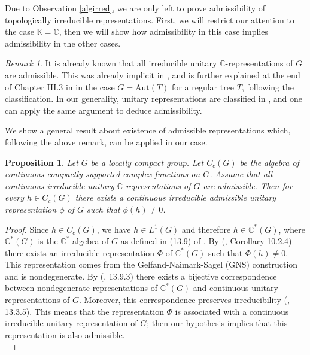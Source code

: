 \documentclass{article}
\theoremstyle{definition}
\theoremstyle{remark}
\newtheorem{rmk}[dfn]{Remark}
\theoremstyle{plain}
\newtheorem{prp}[dfn]{Proposition}
\begin{document}
Due to Observation \ref{algirred}, we are only left to prove admissibility of topologically irreducible representations. First, we will restrict our attention to the case $\mathbb{K}=\mathbb{C}$, then we will show how admissibility in this case implies admissibility in the other cases. \\

\begin{rmk}
    It is already known that all irreducible unitary $\mathbb{C}$-representations of $G$ are admissible. This was already implicit in \cite{olsh2}, and is further explained at the end of Chapter III.3 in \cite{talanebbia} in the case $G=\mathrm{Aut}(T)$ for a regular tree $T$, following the classification. In our generality, unitary representations are classified in \cite{amann}, and one can apply the same argument to deduce admissibility. \\
\end{rmk}

We show a general result about existence of admissible representations which, following the above remark, can be applied in our case.

\begin{prp} \label{exadm}
    Let $G$ be a locally compact group. Let $C_c(G)$ be the algebra of continuous compactly supported complex functions on $G$. Assume that all continuous irreducible unitary $\mathbb{C}$-representations of $G$ are admissible. Then for every $h\in C_c(G)$ there exists a continuous irreducible admissible unitary representation $\phi$ of $G$ such that $\phi(h)\neq 0$.
\end{prp}

\begin{proof}
     Since $h\in C_c(G)$, we have $h\in L^1(G)$ and therefore $h\in\mathbb{C}^*(G)$, where $\mathbb{C}^*(G)$ is the $\mathbb{C}^*$-algebra of $G$ as defined in (13.9) of \cite{dixmier}. By (\cite{kadrin}, Corollary 10.2.4) there exists an irreducible representation $\Phi$ of $\mathbb{C}^*(G)$ such that $\Phi(h)\neq 0$. This representation comes from the Gelfand-Naimark-Sagel (GNS) construction and is nondegenerate. By (\cite{dixmier}, 13.9.3) there exists a bijective correspondence between nondegenerate representations of $\mathbb{C}^*(G)$ and continuous unitary representations of $G$. Moreover, this correspondence preserves irreducibility (\cite{dixmier}, 13.3.5). This means that the representation $\Phi$ is associated with a continuous irreducible unitary representation of $G$; then our hypothesis implies that this representation is also admissible. \\
\end{proof}
\end{document}
